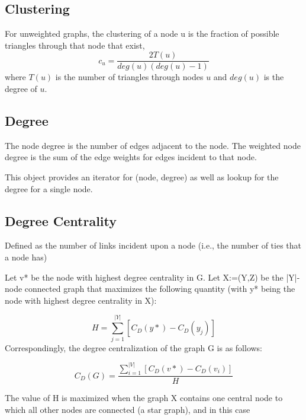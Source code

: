 \documentclass{tum-book}
\begin{document}
            \subsection{Clustering}
            For unweighted graphs, the clustering of a node u is the fraction of possible triangles through that node that exist,
                \begin{equation}
                c_u=\frac{2T(u)}{deg(u)(deg(u)-1)}
                \end{equation}
            where $T(u)$ is the number of triangles through nodes $u$ and $deg(u)$ is the degree of $u$.
    
            \subsection{Degree}
            The node degree is the number of edges adjacent to the node. The weighted node degree is the sum of the edge weights for edges incident to that node.
    
                \bigskip\noindent 
                This object provides an iterator for (node, degree) as well as lookup for the degree for a single node.
    
            \subsection{Degree Centrality}
            Defined as the number of links incident upon a node (i.e., the number of ties that a node has)\cite{Centrali48:online}
            
            \bigskip\noindent
            Let v* be the node with highest degree centrality in G. Let X:=(Y,Z) be the |Y|-node connected graph that maximizes the following quantity (with y* being the node with highest degree centrality in X):
            
                \begin{equation}
                    H=\sum _{{j=1}}^{{|Y|}}[C_{D}(y*)-C_{D}(y_{j})]
                \end{equation}
            \noindent    
            Correspondingly, the degree centralization of the graph G is as follows:
            
                \begin{equation}
                    C_{D}(G)={\frac {\sum _{i=1}^{|V|}[C_{D}(v*)-C_{D}(v_{i})]}{H}}
                \end{equation}

            \noindent
            The value of H is maximized when the graph X contains one central node to which all other nodes are connected (a star graph), and in this case
            
\end{document}

